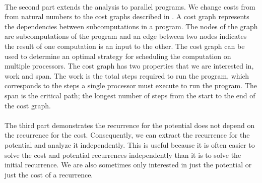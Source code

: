 \paragraph{}
The second part extends the analysis to parallel programs. We change costs from
from natural numbers to the cost graphs described in \citet{Harper2012PFPL}. A cost
graph represents the dependencies between subcomputations in a program. The
nodes of the graph are subcomputations of the program and an edge between two
nodes indicates the result of one computation is an input to the other. The
cost graph can be used to determine an optimal strategy for scheduling the
computation on multiple processors. The cost graph has two properties that we
are interested in, work and span. The work is the total steps required to run
the program, which corresponds to the steps a single processor must execute to
run the program. The span is the critical path; the longest number of steps
from the start to the end of the cost graph.

\paragraph{}
The third part demonstrates the recurrence for the potential does not depend on
the recurrence for the cost. Consequently, we can extract the recurrence for the
potential and analyze it independently. This is useful because it is often
easier to solve the cost and potential recurrences independently than it is to
solve the initial recurrence. We are also sometimes only interested in just the
potential or just the cost of a recurrence.
